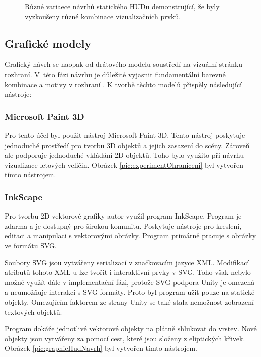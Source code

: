 \begin{figure}[H]
\begin{subfigure}[t]{0.5\linewidth}
    \end{subfigure}
    \caption{Různé variaece návrhů statického HUDu demonstrující, že byly vyzkoušeny různé kombinace vizualizačních prvků.}
    \label{fig:wire2}
\end{figure}

\newpage
\subsection{Grafické modely} %
Grafický návrh se naopak od drátového modelu soustředí na vizuální stránku rozhraní. V~této fázi návrhu je důležité vyjasnit fundamentální barevné kombinace a motivy v rozhraní \cite{KomárekJakub2022Nzps}. K tvorbě těchto modelů přispěly následující nástroje:

\subsubsection{Microsoft Paint 3D}
Pro tento účel byl použit nástroj Microsoft Paint 3D. Tento nástroj poskytuje jednoduché prostředí  pro tvorbu 3D objektů a jejich zasazení do scény. Zároveň ale podporuje jednoduché vkládání 2D objektů. Toho bylo využito při návrhu vizualizace letových veličin. Obrázek \ref{pic:experimentOhraniceni} byl vytvořen tímto nástrojem.
\subsubsection{InkScape} \label{PAR:InkScape}
Pro tvorbu 2D vektorové grafiky autor využil program InkScape.  Program je zdarma a je dostupný pro širokou komunitu. Poskytuje nástroje pro kreslení, editaci a manipulaci s vektorovými obrázky. Program primárně pracuje s obrázky ve formátu SVG. 

Soubory SVG jsou vytvářeny serializací v značkovacím jazyce XML. Modifikací atributů tohoto XML u lze tvořit i interaktivní prvky v SVG. Toho však nebylo možné využít dále v implementační fázi, protože SVG podpora Unity je omezená a  neumožňuje interakci s SVG formáty. Proto byl program užit pouze na statické objekty. Omezujícím faktorem ze strany Unity se také stala nemožnost zobrazení textových objektů.

Program dokáže jednotlivé vektorové objekty na plátně shlukovat do vrstev. Nové objekty jsou vytvářeny za pomocí cest, které jsou složeny z eliptických křivek. Obrázek \ref{pic:graphicHudNavrh} byl vytvořen tímto nástrojem.

